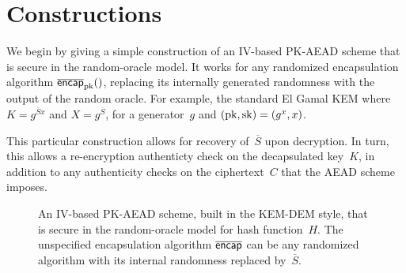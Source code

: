 \section{Constructions}
\label{sec:constructions}
We begin by giving a simple construction of an IV-based PK-AEAD scheme that is secure in the random-oracle model. It works for any randomized encapsulation algorithm $\OLencapprim{\pk}{}$, replacing its internally generated randomness with the output of the random oracle.  For example, the standard El Gamal KEM where $K=g^{\overline{S}x}$ and $X=g^{\overline{S}}$, for a generator~$g$ and $(\mathrm{pk},\mathrm{sk})=(g^x,x)$.

This particular construction allows for recovery of~$\overline{S}$ upon decryption.  In turn, this allows a re-encryption authenticty check on the decapsulated key~$K$, in addition to any authenticity checks on the ciphertext~$C$ that the AEAD scheme imposes.  


\begin{figure}
\begin{center}

\medskip
\hspace*{.5ex} 
\caption{An IV-based PK-AEAD scheme, built in the KEM-DEM style, that is secure in the random-oracle model for hash function~$H$. The unspecified encapsulation algorithm $\overline{\mathsf{encap}}$ can be any randomized algorithm with its internal randomness replaced by~$\overline{S}$.
}
\label{fig:ro-kem-dem-construction}
\end{center}
\end{figure}
